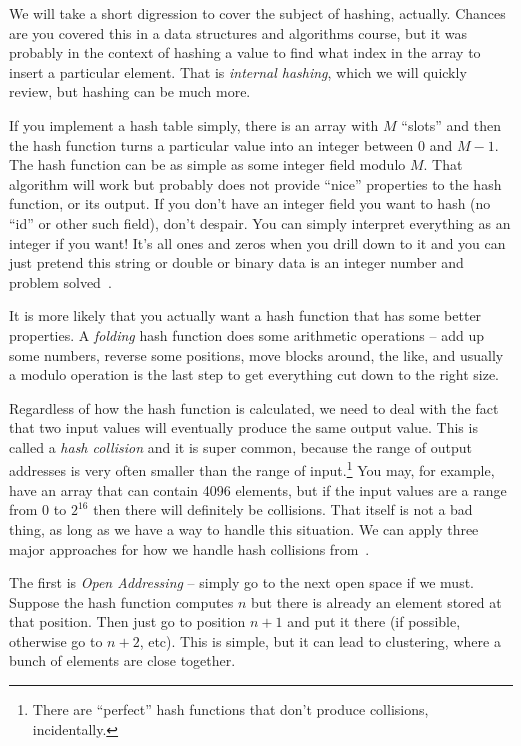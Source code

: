 We will take a short digression to cover the subject of hashing, actually. Chances are you covered this in a data structures and algorithms course, but it was probably in the context of hashing a value to find what index in the array to insert a particular element. That is \textit{internal hashing}, which we will quickly review, but hashing can be much more.

If you implement a hash table simply, there is an array with $M$ ``slots'' and then the hash function turns a particular value into an integer between $0$ and $M-1$. The hash function can be as simple as some integer field modulo $M$. That algorithm will work but probably does not provide ``nice'' properties to the hash function, or its output. If you don't have an integer field you want to hash (no ``id'' or other such field), don't despair. You can simply interpret everything as an integer if you want! It's all ones and zeros when you drill down to it and you can just pretend this string or double or binary data is an integer number and problem solved~\cite{fds}.

It is more likely that you actually want a hash function that has some better properties. A \textit{folding} hash function does some arithmetic operations -- add up some numbers, reverse some positions, move blocks around, the like, and usually a modulo operation is the last step to get everything cut down to the right size.

Regardless of how the hash function is calculated, we need to deal with the fact that two input values will eventually produce the same output value. This is called a \textit{hash collision} and it is super common, because the range of output addresses is very often smaller than the range of input.\footnote{There are ``perfect'' hash functions that don't produce collisions, incidentally.} You may, for example, have an array that can contain 4096 elements, but if the input values are a range from $0$ to $2^{16}$ then there will definitely be collisions. That itself is not a bad thing, as long as we have a way to handle this situation. We can apply three major approaches for how we handle hash collisions from~\cite{fds}. 

The first is \textit{Open Addressing} -- simply go to the next open space if we must. Suppose the hash function computes $n$ but there is already an element stored at that position. Then just go to position $n+1$ and put it there (if possible, otherwise go to $n+2$, etc). This is simple, but it can lead to clustering, where a bunch of elements are close together.

